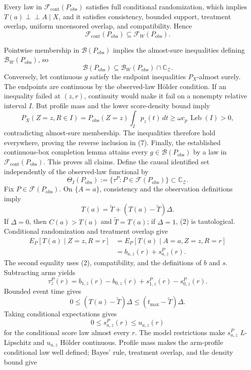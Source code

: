 Every law in \(\mathcal F_{\mathrm{cont}}(P_{\mathrm{obs}})\) satisfies full conditional randomization, which implies \(T(a)\perp\!\!\!\perp A\mid X\), and it satisfies consistency, bounded support, treatment overlap, uniform uncensored overlap, and compatibility.  Hence
\[
\mathcal F_{\mathrm{cont}}(P_{\mathrm{obs}})
\subseteq\mathcal F_W(P_{\mathrm{obs}}).
\tag{6}
\]

Pointwise membership in \(\mathcal B(P_{\mathrm{obs}})\) implies the almost-sure inequalities defining \(\mathcal B_W(P_{\mathrm{obs}})\), so
\[
\mathcal B(P_{\mathrm{obs}})
\subseteq\mathcal B_W(P_{\mathrm{obs}})\cap\mathbb C_{\mathcal Z}.
\tag{7}
\]
Conversely, let continuous \(g\) satisfy the endpoint inequalities \(P_X\)-almost surely.  The endpoints are continuous by the observed-law H\"older condition.  If an inequality failed at \((z,r)\), continuity would make it fail on a nonempty relative interval \(I\).  But profile mass and the lower score-density bound imply
\[
P_X(Z=z,R\in I)
=P_{\mathrm{obs}}(Z=z)\int_Ip_z(t)\,dt
\geq\omega c_p\,\operatorname{Leb}(I)>0,
\tag{8}
\]
contradicting almost-sure membership.  The inequalities therefore hold everywhere, proving the reverse inclusion in (7).  Finally, the established continuous-box completion lemma attains every \(g\in\mathcal B(P_{\mathrm{obs}})\) by a law in \(\mathcal F_{\mathrm{cont}}(P_{\mathrm{obs}})\).  This proves all claims.
Define the causal identified set independently of the observed-law functional by
\[
\Theta_I(P_{\mathrm{obs}})
:=\{\tau^P:P\in\mathcal F(P_{\mathrm{obs}})\}
\subset\mathbb C_{\mathcal Z}.
\tag{1}
\]
Fix \(P\in\mathcal F(P_{\mathrm{obs}})\).  On \(\{A=a\}\), consistency and the observation definitions imply
\[
T(a)=\widetilde T+(T(a)-\widetilde T)\Delta.
\tag{2}
\]
If \(\Delta=0\), then \(C(a)>T(a)\) and \(\widetilde T=T(a)\); if \(\Delta=1\), (2) is tautological.  Conditional randomization and treatment overlap give
\[
\begin{aligned}
E_P[T(a)\mid Z=z,R=r]
&=E_P[T(a)\mid A=a,Z=z,R=r]\\
&=b_{a,z}(r)+s^P_{a,z}(r).
\end{aligned}
\tag{3}
\]
The second equality uses (2), compatibility, and the definitions of \(b\) and \(s\).  Subtracting arms yields
\[
\tau_z^P(r)
=b_{1,z}(r)-b_{0,z}(r)+s^P_{1,z}(r)-s^P_{0,z}(r).
\tag{4}
\]
Bounded event time gives
\[
0\leq(T(a)-\widetilde T)\Delta
\leq(t_{\max}-\widetilde T)\Delta.
\tag{5}
\]
Taking conditional expectations gives
\[
0\leq s^P_{a,z}(r)\leq u_{a,z}(r)
\tag{6}
\]
for the conditional score law almost every \(r\).  The model restrictions make \(s^P_{a,z}\) \(L\)-Lipschitz and \(u_{a,z}\) H\"older continuous.  Profile mass makes the arm-profile conditional law well defined; Bayes' rule, treatment overlap, and the density bound give

